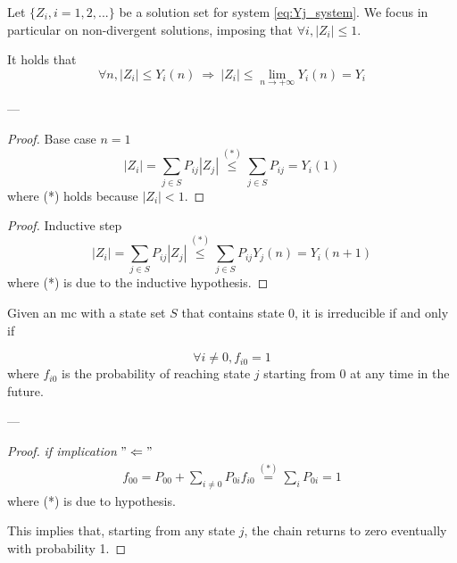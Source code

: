 	\begin{lemma}
		Let $\{Z_i, i=1, 2, ...\}$ be a solution set for system \ref{eq:Yj_system}. We focus in particular on non-divergent solutions, imposing that $ \forall i, |Z_i| \le 1 $.

		It holds that
		$$ \forall n, |Z_i| \le Y_i(n) ~ \Rightarrow ~|Z_i| \le \lim_{n \to +\infty} Y_i(n) = Y_i $$
	\end{lemma}
	---
	\begin{proof} Base case $n=1$
		$$ |Z_i| = \sum_{j \in S} P_{ij} |Z_j| \stackrel{(*)}{\le} \sum_{j \in S} P_{ij} = Y_i(1) $$
		where (*) holds because $|Z_i| < 1$.
	\end{proof}

	\begin{proof} Inductive step
		$$ |Z_i| = \sum_{j \in S} P_{ij} |Z_j| \stackrel{(*)}{\le} \sum_{j \in S} P_{ij} Y_j(n) = Y_i(n+1) $$
		where (*) is due to the inductive hypothesis.
	\end{proof}

	\begin{lemma}[Ross 2, pg. 78-82] \label{lemma:MC_irreducible_fi0}
		Given an \gls{mc} with a state set $S$ that contains state 0, it is irreducible if and only if

		$$ \forall i \neq 0, f_{i 0} = 1 $$
		where $f_{i 0}$ is the probability of reaching state $j$ starting from 0 at any time in the future.
	\end{lemma}
	---
	\begin{proof} \emph{if implication} $"\Leftarrow"$
		\begin{equation}\begin{split}
			f_{00} = P_{00} + \sum_{i \neq 0} P_{0i} f_{i 0} \stackrel{(*)}{=} \sum_{i} P_{0i} = 1
		\end{split}\end{equation}
		where (*) is due to hypothesis.

		This implies that, starting from any state $j$, the chain returns to zero eventually with probability 1.
	\end{proof}

